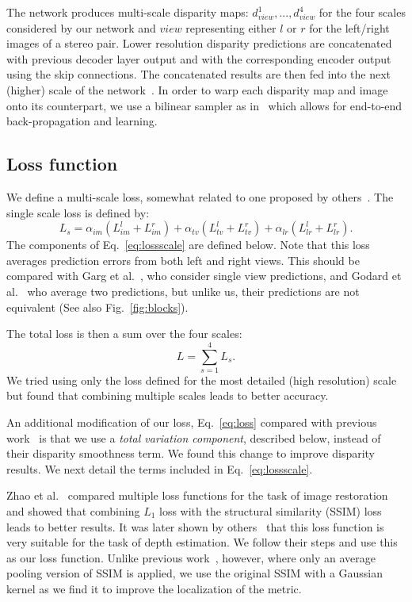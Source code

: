 \documentclass[10pt,twocolumn,letterpaper]{article}
\newcommand{\minisection}[1]{\vspace{1mm}\noindent{\textbf{#1}}}
\begin{document}
The network produces multi-scale disparity maps: $d^1_{view}, ..., d^4_{view}$ for the four scales considered by our network and $view$ representing either $l$ or $r$ for the left/right images of a stereo pair. Lower resolution disparity predictions are concatenated with previous decoder layer output and with the corresponding encoder output using the skip connections. The concatenated results are then fed into the next (higher) scale of the network~\cite{MIFDB16}. In order to warp each disparity map and image onto its counterpart, we use a bilinear sampler as in~\cite{jaderberg2015spatial} which allows for end-to-end back-propagation and learning.

\subsection{Loss function}\label{sec:loss}
We define a multi-scale loss, somewhat related to one proposed by others~\cite{monodepth17}. The single scale loss is defined by:
\begin{equation}\label{eq:lossscale}
	L_s = \alpha_{im} (L^l_{im} + L^r_{im}) + \alpha_{tv} (L^l_{tv} + L^r_{tv}) + \alpha_{lr} (L^l_{lr} + L^r_{lr}).
\end{equation}
The components of Eq.~\eqref{eq:lossscale} are defined below. Note that this loss averages prediction errors from both left and right views. This should be compared with Garg et al.~\cite{garg2016unsupervised}, who consider single view predictions, and Godard et al.~\cite{monodepth17} who average two predictions, but unlike us, their predictions are not equivalent (See also Fig.~\ref{fig:blocks}).

The total loss is then a sum over the four scales:
\begin{equation}\label{eq:loss}
	L= \sum_{s=1}^4{L_s}.
\end{equation}
We tried using only the loss defined for the most detailed (high resolution) scale but found that combining multiple scales leads to better accuracy.

An additional modification of our loss, Eq.~\eqref{eq:loss} compared with previous work~\cite{monodepth17} is that we use a {\em total variation component}, described below, instead of their disparity smoothness term. We found this change to improve disparity results. We next detail the terms included in Eq.~\eqref{eq:lossscale}.

\minisection{Image loss.} Zhao et al.~\cite{zhao2017loss} compared multiple loss functions for the task of image restoration and showed that combining $L_1$ loss with the structural similarity (SSIM) loss~\cite{wang2004image} leads to better results. It was later shown by others~\cite{monodepth17,geonet} that this loss function is very suitable for the task of depth estimation. We follow their steps and use this as our loss function. Unlike previous work~\cite{monodepth17}, however, where only an average pooling version of SSIM is applied, we use the original SSIM with a Gaussian kernel as we find it to improve the localization of the metric.
\end{document}
